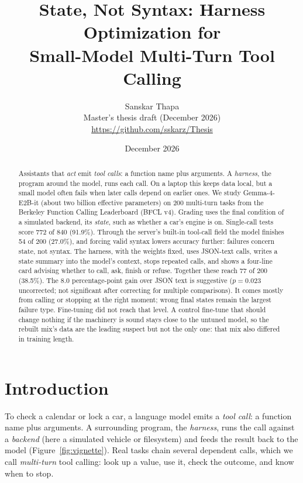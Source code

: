 \documentclass[11pt]{article}
\title{State, Not Syntax: Harness Optimization for\\ Small-Model Multi-Turn Tool Calling}
\author{Sanskar Thapa\\[0.4em]
{\normalsize Master's thesis draft (December 2026)}\\[0.2em]
{\normalsize \url{https://github.com/sskarz/Thesis}}}
\date{December 2026}
\begin{document}
\maketitle

\begin{abstract}
Assistants that \emph{act} emit \emph{tool calls}: a function name plus arguments. A \emph{harness}, the program around the model, runs each call. On a laptop this keeps data local, but a small model often fails when later calls depend on earlier ones. We study Gemma-4-E2B-it (about two billion effective parameters) on 200 multi-turn tasks from the Berkeley Function Calling Leaderboard (BFCL v4). Grading uses the final condition of a simulated backend, its \emph{state}, such as whether a car's engine is on. Single-call tests score 772 of 840 (91.9\%). Through the server's built-in tool-call field the model finishes 54 of 200 (27.0\%), and forcing valid syntax lowers accuracy further: failures concern state, not syntax. The harness, with the weights fixed, uses JSON-text calls, writes a state summary into the model's context, stops repeated calls, and shows a four-line card advising whether to call, ask, finish or refuse. Together these reach 77 of 200 (38.5\%). The 8.0 percentage-point gain over JSON text is suggestive ($p=0.023$ uncorrected; not significant after correcting for multiple comparisons). It comes mostly from calling or stopping at the right moment; wrong final states remain the largest failure type. Fine-tuning did not reach that level. A control fine-tune that should change nothing if the machinery is sound stays close to the untuned model, so the rebuilt mix's data are the leading suspect but not the only one: that mix also differed in training length.
\end{abstract}

\section{Introduction}
\label{sec:intro}

To check a calendar or lock a car, a language model emits a \emph{tool call}: a function name plus arguments. A surrounding program, the \emph{harness}, runs the call against a \emph{backend} (here a simulated vehicle or filesystem) and feeds the result back to the model (Figure~\ref{fig:vignette}). Real tasks chain several dependent calls, which we call \emph{multi-turn} tool calling: look up a value, use it, check the outcome, and know when to stop.
\end{document}
